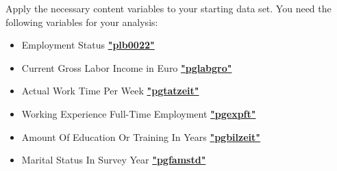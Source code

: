 \documentclass[letterpaper,10pt,openany,onesideH,english]{sphinxmanual}
\begin{document}
Apply the necessary content variables to your starting data set. You need the following variables for your analysis:
\begin{itemize}
\item {} 
Employment Status  \href{https://paneldata.org/soep-long/data/pl/plb0022}{\textbf{"plb0022"}}

\item {} 
Current Gross Labor Income in Euro  \href{https://paneldata.org/soep-long/data/pgen/pglabgro}{\textbf{"pglabgro"}}

\item {} 
Actual Work Time Per Week  \href{https://paneldata.org/soep-long/data/pgen/pglabgro}{\textbf{"pgtatzeit"}}

\item {} 
Working Experience Full-Time Employment  \href{https://paneldata.org/soep-long/data/pgen/pgexpft}{\textbf{"pgexpft"}}

\item {} 
Amount Of Education Or Training In Years  \href{https://paneldata.org/soep-long/data/pgen/pgbilzeit}{\textbf{"pgbilzeit"}}

\item {} 
Marital Status In Survey Year  \href{https://paneldata.org/soep-long/data/pgen/pgfamstd}{\textbf{"pgfamstd"}}

\end{itemize}

%
\begin{sphinxVerbatim}[commandchars=\\\{\},numbers=left,firstnumber=1,stepnumber=1]
         
             
\end{sphinxVerbatim}
\end{document}
